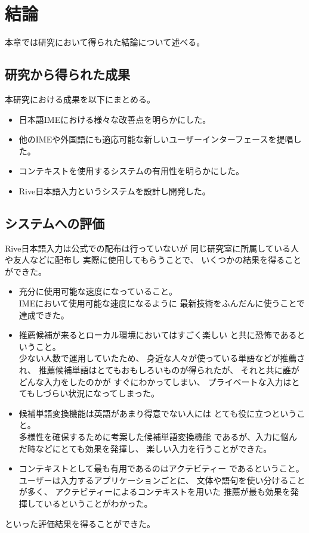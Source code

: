 \chapter{結論}
\label{chap:conclusion}
本章では研究において得られた結論について述べる。

\newpage
\section{研究から得られた成果}
本研究における成果を以下にまとめる。
\begin{itemize}
  \item 日本語IMEにおける様々な改善点を明らかにした。
  \item 他のIMEや外国語にも適応可能な新しいユーザーインターフェースを提唱した。
  \item コンテキストを使用するシステムの有用性を明らかにした。
  \item Rive日本語入力というシステムを設計し開発した。
\end{itemize}

\section{システムへの評価}
Rive日本語入力は公式での配布は行っていないが
同じ研究室に所属している人や友人などに配布し
実際に使用してもらうことで、
いくつかの結果を得ることができた。
\begin{itemize}
  \item 充分に使用可能な速度になっていること。\mbox{}\\
    IMEにおいて使用可能な速度になるように
    最新技術をふんだんに使うことで達成できた。
  \item 推薦候補が来るとローカル環境においてはすごく楽しい
    と共に恐怖であるということ。\mbox{}\\
    少ない人数で運用していたため、
    身近な人々が使っている単語などが推薦され、
    推薦候補単語はとてもおもしろいものが得られたが、
    それと共に誰がどんな入力をしたのかが
    すぐにわかってしまい、
    プライベートな入力はとてもしづらい状況になってしまった。
  \item 候補単語変換機能は英語があまり得意でない人には
    とても役に立つということ。\mbox{}\\
    多様性を確保するために考案した候補単語変換機能
    であるが、入力に悩んだ時などにとても効果を発揮し、
    楽しい入力を行うことができた。
  \item コンテキストとして最も有用であるのはアクテビティー
  であるということ。\mbox{}\\
    ユーザーは入力するアプリケーションごとに、
    文体や語句を使い分けることが多く、
    アクテビティーによるコンテキストを用いた
    推薦が最も効果を発揮しているということがわかった。
\end{itemize}
といった評価結果を得ることができた。

